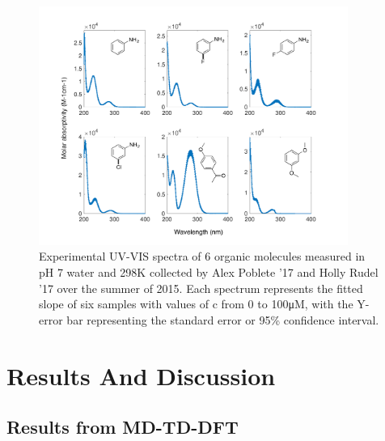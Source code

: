 \documentclass[
journal=jpcbfk, %
manuscript=article]{achemso}
\begin{document}
	\begin{figure}[!htb]
		\centering		
		\includegraphics[width=0.9\textwidth]{images/abs_added.pdf}
		\caption{Experimental UV-VIS spectra of 6 organic molecules measured in pH 7 water and 298K collected by Alex Poblete '17 and Holly Rudel '17 over the summer of 2015. Each spectrum represents the fitted slope of six samples with values of c from 0 to 100μM, with the Y-error bar representing the standard error or 95\% confidence interval.}
		\label{fig:abs_added}
	\end{figure}
	\clearpage
	
	\section{Results And Discussion}

\subsection{Results from MD-TD-DFT} \label{step3}
\end{document}
